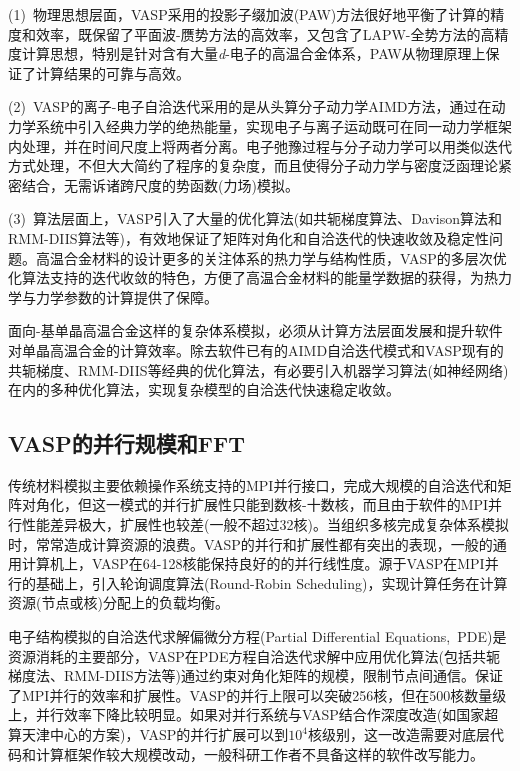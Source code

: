 (1)~物理思想层面，\textrm{VASP}采用的投影子缀加波\textrm{(PAW)}方法很好地平衡了计算的精度和效率，既保留了平面波-赝势方法的高效率，又包含了\textrm{LAPW}-全势方法的高精度计算思想，特别是针对含有大量\textit{d}-电子的高温合金体系，\textrm{PAW}从物理原理上保证了计算结果的可靠与高效。

(2)~\textrm{VASP}的离子-电子自洽迭代采用的是从头算分子动力学\textrm{AIMD}方法，通过在动力学系统中引入经典力学的绝热能量，实现电子与离子运动既可在同一动力学框架内处理，并在时间尺度上将两者分离。电子弛豫过程与分子动力学可以用类似迭代方式处理，不但大大简约了程序的复杂度，而且使得分子动力学与密度泛函理论紧密结合，无需诉诸跨尺度的势函数(力场)模拟。

(3)~算法层面上，\textrm{VASP}引入了大量的优化算法(如共轭梯度算法、\textrm{Davison}算法和\textrm{RMM-DIIS}算法等)，有效地保证了矩阵对角化和自洽迭代的快速收敛及稳定性问题。高温合金材料的设计更多的关注体系的热力学与结构性质，\textrm{VASP}的多层次优化算法支持的迭代收敛的特色，方便了高温合金材料的能量学数据的获得，为热力学与力学参数的计算提供了保障。

面向-基单晶高温合金这样的复杂体系模拟，必须从计算方法层面发展和提升软件对单晶高温合金的计算效率。除去软件已有的\textrm{AIMD}自洽迭代模式和\textrm{VASP}现有的共轭梯度、\textrm{RMM-DIIS}等经典的优化算法，有必要引入机器学习算法(如神经网络)在内的多种优化算法，实现复杂模型的自洽迭代快速稳定收敛。

\subsection{\rm{VASP}的并行规模和\rm{FFT}}
传统材料模拟主要依赖操作系统支持的\textrm{MPI}并行接口，完成大规模的自洽迭代和矩阵对角化，但这一模式的并行扩展性只能到数核-十数核，而且由于软件的\textrm{MPI}并行性能差异极大，扩展性也较差(一般不超过32核)。当组织多核完成复杂体系模拟时，常常造成计算资源的浪费。\textrm{VASP}的并行和扩展性都有突出的表现，一般的通用计算机上，\textrm{VASP}在64-128核能保持良好的的并行线性度。源于\textrm{VASP}在\textrm{MPI}并行的基础上，引入轮询调度算法\textrm{(Round-Robin Scheduling)}，实现计算任务在计算资源(节点或核)分配上的负载均衡。

电子结构模拟的自洽迭代求解偏微分方程\textrm{(Partial Differential Equations,~PDE)}是资源消耗的主要部分，\textrm{VASP}在\textrm{PDE}方程自洽迭代求解中应用优化算法(包括共轭梯度法、\textrm{RMM-DIIS}方法等)通过约束对角化矩阵的规模，限制节点间通信。保证了\textrm{MPI}并行的效率和扩展性。\textrm{VASP}的并行上限可以突破256核，但在500核数量级上，并行效率下降比较明显。如果对并行系统与\textrm{VASP}结合作深度改造(如国家超算天津中心的方案)，\textrm{VASP}的并行扩展可以到$10^4$核级别，这一改造需要对底层代码和计算框架作较大规模改动，一般科研工作者不具备这样的软件改写能力。

